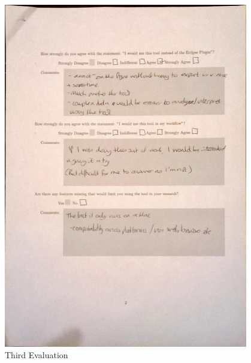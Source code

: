 \begin{figure}[h!]
    \centering
    \includegraphics[width=0.95\textwidth]{images/user_eval/user_eval_19.jpg}
    \caption{Third Evaluation}
\end{figure}

